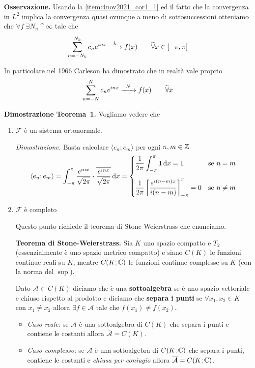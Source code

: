 \textbf{Osservazione.}
Usando la \ref{item:4nov2021_cor1_1} ed il fatto che la convergenza in $L^2$ implica la convergenza quasi ovunque a meno di sottosuccessioni otteniamo che $\forall f \; \exists N_n \uparrow \infty$ tale che
$$
\sum_{n = -N_k}^{N_k} c_n e^{inx} \xrightarrow{\;\;k\;\;} f(x) \qquad \widetilde\forall x \in [-\pi, \pi]
$$

In particolare nel 1966 Carleson ha dimostrato che in realtà vale proprio
$$
\sum_{n = -N}^N c_n e^{inx} \xrightarrow{\;\;N\;\;} f(x) \qquad \widetilde\forall x
$$

\textbf{Dimostrazione Teorema~1.}
Vogliamo vedere che
\begin{enumerate}
	\item $\mathcal F$ è un sistema ortonormale.

		\textit{Dimostrazione.}
		Basta calcolare $\langle e_n; e_m \rangle$ per ogni $n, m \in \mathbb Z$
		$$
		\langle e_n; e_m \rangle
		= \int_{-\pi}^\pi \frac{e^{inx}}{\sqrt{2\pi}} \cdot \overline{\frac{e^{inx}}{\sqrt{2\pi}}} \,\mathrm{d} x
		=
		\begin{cases}
			\displaystyle \frac{1}{2\pi} \int_{-\pi}^\pi 1 \,\mathrm{d} x = 1 & \text{se } n = m \\[15pt]
			\displaystyle \frac{1}{2\pi} \left[ \frac{e^{i(n - m)x}}{i(n - m)} \right]_{-\pi}^\pi = 0& \text{se } n \neq m \\
		\end{cases}
		$$

	\item $\mathcal F$ è completo

		Questo punto richiede il teorema di Stone-Weierstrass che enunciamo.

		\textbf{Teorema di Stone-Weierstrass.}
		Sia $K$ uno spazio compatto e $T_2$ (essenzialmente è uno spazio metrico compatto) e siano $C(K)$ le funzioni continue reali su $K$, mentre $C(K; \mathbb C)$ le funzioni continue complesse su $K$ (con la norma del $\sup$).

		Dato $\mathcal A \subset C(K)$ diciamo che è una \textbf{sottoalgebra} se è uno spazio vettoriale e chiuso rispetto al prodotto e diciamo che \textbf{separa i punti} se $\forall x_1, x_2 \in K$ con $x_1 \neq x_2$ allora $\exists f \in \mathcal A$ tale che $f(x_1) \neq f(x_2)$.
		\begin{itemize}
			\item \textit{Caso reale:}
			se $\mathcal A$ è una sottoalgebra di $C(K)$ che separa i punti e contiene le costanti allora $\overline{\mathcal A} = C(K)$.
			
			\item \textit{Caso complesso:}
			se $\mathcal A$ è una sottoalgebra di $C(K; \mathbb C)$ che separa i punti, contiene le costanti e \textit{chiusa per coniugio} allora $\overline{\mathcal A} = C(K; \mathbb C)$.
			

\end{itemize}
\end{enumerate}
